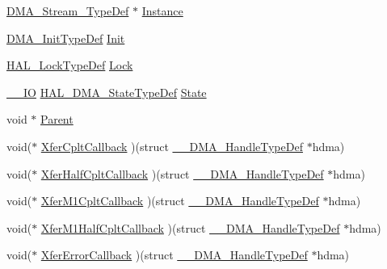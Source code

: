 \begin{DoxyCompactItemize}
\item 
\mbox{\hyperlink{struct_d_m_a___stream___type_def}{D\+M\+A\+\_\+\+Stream\+\_\+\+Type\+Def}} $\ast$ \mbox{\hyperlink{struct_____d_m_a___handle_type_def_acf2416c7f97b4f21ef16cfa5bea3cfd3}{Instance}}
\item 
\mbox{\hyperlink{struct_d_m_a___init_type_def}{D\+M\+A\+\_\+\+Init\+Type\+Def}} \mbox{\hyperlink{struct_____d_m_a___handle_type_def_a4352c7144ad5e1e4ab54a87d3be6eb62}{Init}}
\item 
\mbox{\hyperlink{stm32f4xx__hal__def_8h_ab367482e943333a1299294eadaad284b}{H\+A\+L\+\_\+\+Lock\+Type\+Def}} \mbox{\hyperlink{struct_____d_m_a___handle_type_def_ad4cf225029dbefe8d3fe660c33b8bb6b}{Lock}}
\item 
\mbox{\hyperlink{core__sc300_8h_aec43007d9998a0a0e01faede4133d6be}{\+\_\+\+\_\+\+IO}} \mbox{\hyperlink{group___d_m_a___exported___types_ga9c012af359987a240826f29073bbe463}{H\+A\+L\+\_\+\+D\+M\+A\+\_\+\+State\+Type\+Def}} \mbox{\hyperlink{struct_____d_m_a___handle_type_def_a2263083d2bfa96222f3d7b8339c6faf8}{State}}
\item 
void $\ast$ \mbox{\hyperlink{struct_____d_m_a___handle_type_def_a6ee5f2130887847bbc051932ea43b73d}{Parent}}
\item 
void($\ast$ \mbox{\hyperlink{struct_____d_m_a___handle_type_def_a62a5dfe04a3c53000f26d741e4a27ab4}{Xfer\+Cplt\+Callback}} )(struct \mbox{\hyperlink{struct_____d_m_a___handle_type_def}{\+\_\+\+\_\+\+D\+M\+A\+\_\+\+Handle\+Type\+Def}} $\ast$hdma)
\item 
void($\ast$ \mbox{\hyperlink{struct_____d_m_a___handle_type_def_afef2948f0688c22257a540f699e31720}{Xfer\+Half\+Cplt\+Callback}} )(struct \mbox{\hyperlink{struct_____d_m_a___handle_type_def}{\+\_\+\+\_\+\+D\+M\+A\+\_\+\+Handle\+Type\+Def}} $\ast$hdma)
\item 
void($\ast$ \mbox{\hyperlink{struct_____d_m_a___handle_type_def_a7223b08d7509224b3050254ad7462463}{Xfer\+M1\+Cplt\+Callback}} )(struct \mbox{\hyperlink{struct_____d_m_a___handle_type_def}{\+\_\+\+\_\+\+D\+M\+A\+\_\+\+Handle\+Type\+Def}} $\ast$hdma)
\item 
void($\ast$ \mbox{\hyperlink{struct_____d_m_a___handle_type_def_aaa7180782f4a39696344c25766085d10}{Xfer\+M1\+Half\+Cplt\+Callback}} )(struct \mbox{\hyperlink{struct_____d_m_a___handle_type_def}{\+\_\+\+\_\+\+D\+M\+A\+\_\+\+Handle\+Type\+Def}} $\ast$hdma)
\item 
void($\ast$ \mbox{\hyperlink{struct_____d_m_a___handle_type_def_a074ff1d4bf731a9cd85e554f1faec29b}{Xfer\+Error\+Callback}} )(struct \mbox{\hyperlink{struct_____d_m_a___handle_type_def}{\+\_\+\+\_\+\+D\+M\+A\+\_\+\+Handle\+Type\+Def}} $\ast$hdma)

\end{DoxyCompactItemize}
